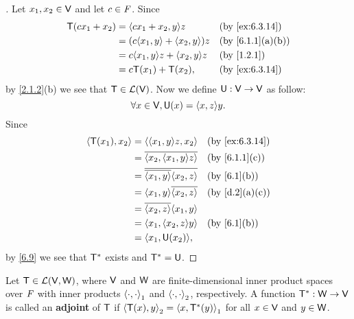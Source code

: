 \begin{proof}[]
  Let \(x_1, x_2 \in \mathsf{V}\) and let \(c \in \mathit{F}\).
  Since
  \begin{align*}
    \T(c x_1 + x_2) & = \inn{c x_1 + x_2, y} z            &  & \text{(by \cref{ex:6.3.14})}   \\
                    & = (c \inn{x_1, y} + \inn{x_2, y}) z &  & \text{(by \cref{6.1.1}(a)(b))} \\
                    & = c \inn{x_1, y} z + \inn{x_2, y} z &  & \text{(by \cref{1.2.1})}       \\
                    & = c \T(x_1) + \T(x_2),              &  & \text{(by \cref{ex:6.3.14})}
  \end{align*}
  by \cref{2.1.2}(b) we see that \(\mathsf{T} \in \mathcal{L}(\mathsf{V})\).
  Now we define \(\mathsf{U} : \mathsf{V} \to \mathsf{V}\) as follow:
  \[
    \forall x \in \V, \U(x) = \inn{x, z} y.
  \]
  Since
  \begin{align*}
    \inn{\T(x_1), x_2} & = \inn{\inn{x_1, y} z, x_2}               &  & \text{(by \cref{ex:6.3.14})} \\
                       & = \conj{\inn{x_2, \inn{x_1, y} z}}        &  & \text{(by \cref{6.1.1}(c))}  \\
                       & = \conj{\conj{\inn{x_1, y}} \inn{x_2, z}} &  & \text{(by \cref{6.1}(b))}    \\
                       & = \inn{x_1, y} \conj{\inn{x_2, z}}        &  & \text{(by \cref{d.2}(a)(c))} \\
                       & = \conj{\inn{x_2, z}} \inn{x_1, y}                                          \\
                       & = \inn{x_1, \inn{x_2, z} y}               &  & \text{(by \cref{6.1}(b))}    \\
                       & = \inn{x_1, \U(x_2)},
  \end{align*}
  by \cref{6.9} we see that \(\mathsf{T}^*\) exists and \(\mathsf{T}^* = \mathsf{U}\).
\end{proof}

\begin{defn}\label{6.3.8}
  Let \(\mathsf{T} \in \mathcal{L}(\mathsf{V}, \mathsf{W})\), where \(\mathsf{V}\) and \(\mathsf{W}\) are finite-dimensional inner product spaces over \(\mathit{F}\) with inner products \(\left\langle\cdot, \cdot\right\rangle_1\) and \(\left\langle\cdot, \cdot\right\rangle_2\), respectively.
  A function \(\mathsf{T}^* : \mathsf{W} \to \mathsf{V}\) is called an \textbf{adjoint} of \(\mathsf{T}\) if \(\left\langle\mathsf{T}(x), y\right\rangle_2 = \left\langle x, \mathsf{T}^*(y)\right\rangle_1\) for all \(x \in \mathsf{V}\) and \(y \in \mathsf{W}\).
\end{defn}

